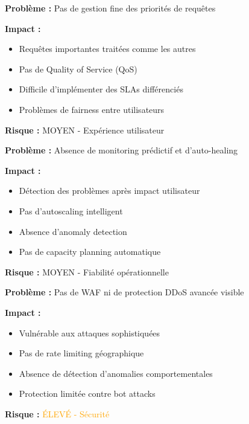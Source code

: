 \documentclass[12pt,a4paper]{article}
\begin{document}
\begin{tcolorbox}[title=\textbf{CRITIQUE 4 : Absence de Queue de Priorité Intelligente},colback=yellow!10,colframe=yellow!60!black]
\textbf{Problème :} Pas de gestion fine des priorités de requêtes

\textbf{Impact :}
\begin{itemize}[noitemsep]
    \item Requêtes importantes traitées comme les autres
    \item Pas de Quality of Service (QoS)
    \item Difficile d'implémenter des SLAs différenciés
    \item Problèmes de fairness entre utilisateurs
\end{itemize}

\textbf{Risque :} \textcolor{yellow!80!black}{MOYEN - Expérience utilisateur}
\end{tcolorbox}

\begin{tcolorbox}[title=\textbf{CRITIQUE 5 : Monitoring Réactif Uniquement},colback=yellow!10,colframe=yellow!60!black]
\textbf{Problème :} Absence de monitoring prédictif et d'auto-healing

\textbf{Impact :}
\begin{itemize}[noitemsep]
    \item Détection des problèmes après impact utilisateur
    \item Pas d'autoscaling intelligent
    \item Absence d'anomaly detection
    \item Pas de capacity planning automatique
\end{itemize}

\textbf{Risque :} \textcolor{yellow!80!black}{MOYEN - Fiabilité opérationnelle}
\end{tcolorbox}

\begin{tcolorbox}[title=\textbf{CRITIQUE 6 : Sécurité Périmétrique Insuffisante},colback=orange!10,colframe=orange!60!black]
\textbf{Problème :} Pas de WAF ni de protection DDoS avancée visible

\textbf{Impact :}
\begin{itemize}[noitemsep]
    \item Vulnérable aux attaques sophistiquées
    \item Pas de rate limiting géographique
    \item Absence de détection d'anomalies comportementales
    \item Protection limitée contre bot attacks
\end{itemize}

\textbf{Risque :} \textcolor{orange}{ÉLEVÉ - Sécurité}
\end{tcolorbox}
\end{document}
